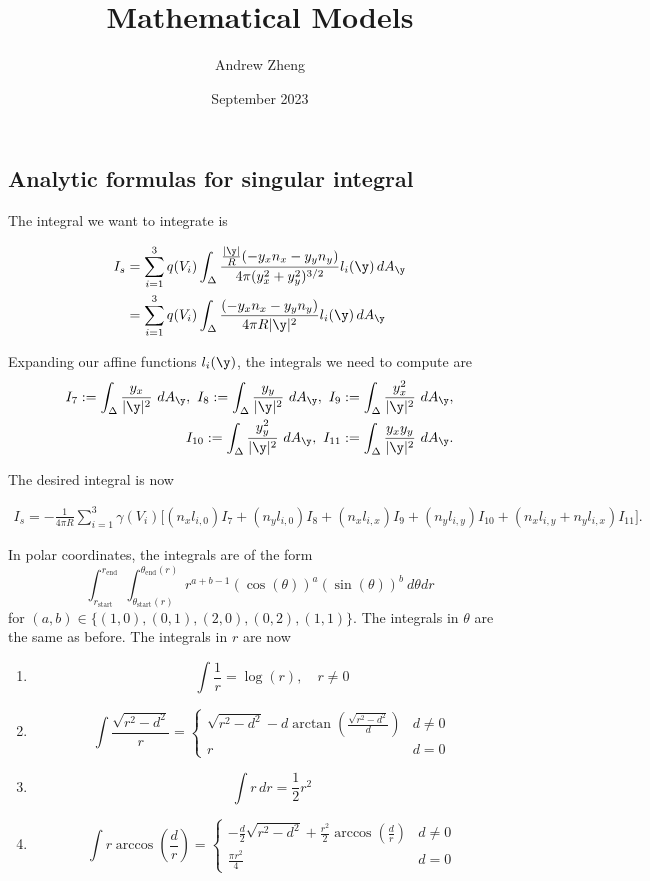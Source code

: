 \documentclass{article}
\title{Mathematical Models}
\author{Andrew Zheng}
\date{September 2023}
\numberwithin{equation}{section}
\begin{document}
\subsection{Analytic formulas for singular integral}\label{appendix: formual for singular integral}

The integral we want to integrate is

\begin{align}
    I_s &= \sum_{i=1}^3 q(V_i) \int_\Delta \frac{\frac{|\y|}{R} (-y_x n_x - y_y n_y)}{4\pi(y_x^2+y_y^2)^{3/2}} l_i(\y) \, dA_{\y} \\
    &= \sum_{i=1}^3 q(V_i) \int_\Delta \frac{(-y_x n_x - y_y n_y)}{4\pi R|\y|^2} l_i(\y) \, dA_{\y}
\end{align}

Expanding our affine functions $l_i(\y)$, the integrals we need to compute are
\begin{align*}
I_7:=\int_\Delta \frac{y_x}{|\y|^2}~dA_{\y},~ I_8:=\int_\Delta \frac{y_y}{|\y|^2}~dA_{\y}, ~ I_9:=\int_\Delta \frac{y_x^2}{|\y|^2}~dA_{\y}, 
\\ I_{10}:=\int_\Delta \frac{y_y^2}{|\y|^2}~dA_{\y}, ~ I_{11}:=\int_\Delta \frac{y_xy_y}{|\y|^2}~dA_{\y}.
\end{align*}

The desired integral is now

\begin{align*}
I_s = -\frac{1}{4\pi R}\sum_{i=1}^3 \gamma(V_i) \big[ (n_x l_{i,0} ) I_7 + (n_y l_{i,0}) I_8 + (n_x l_{i,x}) I_9 + (n_y l_{i,y} ) I_{10} + (n_x l_{i,y} + n_y l_{i, x}) I_{11} \big].
\end{align*}

In polar coordinates, the integrals are of the form
\begin{equation*}
    \int_{r_\mathrm{start}}^{r_\mathrm{end}} \int_{\theta_\mathrm{start}(r)}^{\theta_\mathrm{end}(r)} r^{a+b-1}(\cos(\theta))^a(\sin(\theta))^b ~d\theta dr
\end{equation*}
for $(a, b) \in \{ (1, 0), (0, 1), (2, 0), (0, 2), (1, 1)\}$. The integrals in $\theta$ are the same as before. The integrals in $r$ are now 

\begin{enumerate}
\item $$\int \frac{1}{r} = \log(r), \quad r\ne 0$$

\item $$\int \frac{\sqrt{r^2 - d^2}}{r} = \begin{cases}
    \sqrt{r^2 - d^2} - d \arctan\left( \frac{\sqrt{r^2 - d^2}}{d}\right) & d \ne 0 \\
    r & d = 0
\end{cases}$$

\item $$\int r \, dr = \frac{1}{2} r^2$$

\item $$\int r \arccos\left(\frac{d}{r}\right) = \begin{cases}
    -\frac{d}{2}\sqrt{r^2 - d^2}  + \frac{r^2}{2} \arccos\left(\frac{d}{r}\right) & d \ne 0 \\
    \frac{\pi r^2}{4}& d = 0
\end{cases}$$
\end{enumerate}
\end{document}
